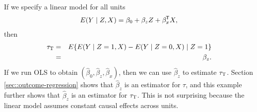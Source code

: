 \begin{example}\label{eg::att-regression1}
If we specify a linear model for all units
$$
E(Y\mid Z, X) = \beta_0  + \beta_z  Z + \beta_x^{\mkern-1.5mu\mathsf{T}} X,
$$
then 
\begin{eqnarray*}
\tau_\textsc{T} &=& E\{   E(Y\mid Z=1, X)  -  E(    Y \mid Z=0 , X)  \mid Z=1\} \\
&=&  \beta_z.
\end{eqnarray*}
If we run OLS to obtain $( \hat{\beta}_0, \hat{\beta}_z,  \hat{\beta}_x )$, then we can use $\hat{\beta}_z$ to estimate $\tau_\textsc{T} $. 
%
%
Section \ref{sec::outcome-regression} shows that $\hat{\beta}_z$ is an estimator for $\tau$, and this example further shows that $\hat{\beta}_z$ is an estimator for $\tau_\textsc{T}$. This is not surprising because the linear model assumes constant causal effects across units. 
\end{example}


